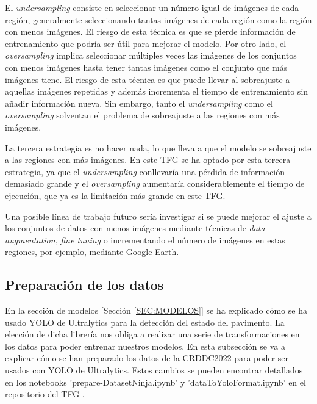 El \textit{undersampling} consiste en seleccionar un número igual de imágenes de cada región, generalmente seleccionando tantas imágenes de cada región como la región con menos imágenes. El riesgo de esta técnica es que se pierde información de entrenamiento que podría ser útil para mejorar el modelo. Por otro lado, el \textit{oversampling} implica seleccionar múltiples veces las imágenes de los conjuntos con menos imágenes hasta tener tantas imágenes como el conjunto que más imágenes tiene. El riesgo de esta técnica es que puede llevar al sobreajuste a aquellas imágenes repetidas y además incrementa el tiempo de entrenamiento sin añadir información nueva. Sin embargo, tanto el \textit{undersampling} como el \textit{oversampling} solventan el problema de sobreajuste a las regiones con más imágenes.

La tercera estrategia es no hacer nada, lo que lleva a que el modelo se sobreajuste a las regiones con más imágenes. En este TFG se ha optado por esta tercera estrategia, ya que el \textit{undersampling} conllevaría una pérdida de información demasiado grande y el \textit{oversampling} aumentaría considerablemente el tiempo de ejecución, que ya es la limitación más grande en este TFG.

Una posible línea de trabajo futuro sería investigar si se puede mejorar el ajuste a los conjuntos de datos con menos imágenes mediante técnicas de \textit{data augmentation}, \textit{fine tuning} o incrementando el número de imágenes en estas regiones, por ejemplo, mediante Google Earth.


\subsection{Preparación de los datos}
En la sección de modelos [Sección \ref{SEC:MODELOS}] se ha explicado cómo se ha usado YOLO de Ultralytics para la detección del estado del pavimento. La elección de dicha librería nos obliga a realizar una serie de transformaciones en los datos para poder entrenar nuestros modelos. En esta subsección se va a explicar cómo se han preparado los datos de la CRDDC2022 para poder ser usados con YOLO de Ultralytics. Estos cambios se pueden encontrar detallados en los notebooks 'prepare-DatasetNinja.ipynb' y 'dataToYoloFormat.ipynb' en el repositorio del TFG \cite{TFG_Repository}.

